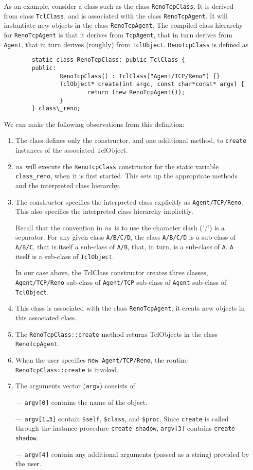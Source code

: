 As an example, consider a class such as the
class {\tt RenoTcpClass}.
It is derived from class {\tt TclClass}, and
is associated with the class {\tt RenoTcpAgent}.
It will instantiate new objects in the class {\tt RenoTcpAgent}.
The compiled class hierarchy for {\tt RenoTcpAgent} is that
it derives from {\tt TcpAgent}, that in turn derives from {\tt Agent},
that in turn derives (roughly) from {\tt TclObject}.
{\tt RenoTcpClass} is defined as
\begin{verbatim}
        static class RenoTcpClass: public TclClass {
        public:
                RenoTcpClass() : TclClass("Agent/TCP/Reno") {}
                TclObject* create(int argc, const char*const* argv) {
                        return (new RenoTcpAgent());
                }
        } class\_reno;
\end{verbatim}
We can make the following observations from this definition:
\begin{enumerate}
\item The class defines only the constructor, and one additional method,
  to {\tt create} instances of the associated TclObject.
\item \emph{ns}\ will execute the {\tt RenoTcpClass} constructor
  for the static variable {\tt class\_reno}, when it is first started.
  This sets up the appropriate methods and the interpreted class hierarchy.
\item The constructor specifies the interpreted class explicitly as
  {\tt Agent/TCP/Reno}.  This also specifies the interpreted class
  hierarchy implicitly.

  Recall that the convention in \emph{ns}\ is to use
  the character slash ('/') is a separator.
  For any given class {\tt A/B/C/D},
  the class {\tt A/B/C/D} is a sub-class of {\tt A/B/C},
  that is itself a sub-class of {\tt A/B},
  that, in turn, is a sub-class of {\tt A}.
  {\tt A} itself is a sub-class of {\tt TclObject}.

  In our case above, the TclClass constructor creates three classes,
  {\tt Agent/TCP/Reno} sub-class of {\tt Agent/TCP}
  sub-class of {\tt Agent} sub-class of {\tt TclObject}.
\item This class is associated with the class {\tt RenoTcpAgent};
  it creats new objects in this associated class.
\item The {\tt RenoTcpClass::create} method returns TclObjects in the
  class {\tt RenoTcpAgent}.
\item When the user specifies {\tt new Agent/TCP/Reno},
  the routine {\tt RenoTcpClass::create} is invoked.
\item The arguments vector ({\tt argv}) consists of

  --- {\tt argv[0]} contains the name of the object.

  --- {\tt argv[1\ldots3]} contain
  {\tt \$self}, {\tt \$class}, and {\tt \$proc}.%
  Since {\tt create} is called
  through the instance procedure {\tt create-shadow},
  {\tt argv[3]} contains {\tt create-shadow}.

  --- {\tt argv[4]}
  contain any additional arguments (passed as a string) provided by the user.
\end{enumerate}
